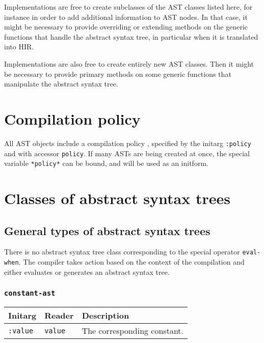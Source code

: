Implementations are free to create subclasses of the AST classes
listed here, for instance in order to add additional information to
AST nodes.  In that case, it might be necessary to provide overriding
or extending methods on the generic functions that handle the abstract
syntax tree, in particular when it is translated into HIR.

Implementations are also free to create entirely new AST classes.
Then it might be necessary to provide primary methods on some generic
functions that manipulate the abstract syntax tree.%

\section{Compilation policy}

All AST objects include a compilation policy ,
specified by the initarg \texttt{:policy} and with accessor
\texttt{policy}. If many ASTs are being created at once, the
special variable \texttt{*policy*} can be bound, and will be used
as an initform.

\section{Classes of abstract syntax trees}

\subsection{General types of abstract syntax trees}

There is no abstract syntax tree class corresponding to the special
operator \texttt{eval-when}.  The compiler takes action based on the
context of the compilation and either evaluates or generates an
abstract syntax tree.

\subsubsection{\texttt{constant-ast}}
\label{constant-ast}

\begin{tabular}{|l|l|l|}
\hline
Initarg & Reader & Description\\
\hline\hline
\texttt{:value} & \texttt{value} & The corresponding constant.\\
\hline
\end{tabular}


